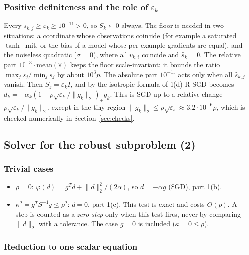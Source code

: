 \documentclass[11pt,a4paper]{article}
\newcommand{\norm}[1]{\lVert #1\rVert_2}
\begin{document}
\subsubsection*{Positive definiteness and the role of $\varepsilon_k$}

Every $s_{k,j}\ge\varepsilon_k\ge10^{-11}>0$, so $S_k\succ0$ always. The floor is
needed in two situations: a coordinate whose observations coincide (for example a
saturated $\tanh$ unit, or the bias of a model whose per-example gradients are equal),
and the noiseless quadratic ($\sigma=0$), where all $v_{k,i}$ coincide and
$\widehat s_k=0$. The relative part $10^{-3}\cdot\text{mean}(\widehat s)$ keeps the
floor scale-invariant: it bounds the ratio $\max_js_j/\min_js_j$ by about $10^3p$.
The absolute part $10^{-11}$ acts only when all $\widehat s_{k,j}$ vanish. Then
$S_k=\varepsilon_kI$, and by the isotropic formula of 1(d) R-SGD becomes
$d_k=-\alpha_k(1-\rho\sqrt{\varepsilon_k}/\norm{g_k})_+g_k$. This is SGD up to a
relative change $\rho\sqrt{\varepsilon_k}/\norm{g_k}$, except in the tiny region
$\norm{g_k}\le\rho\sqrt{\varepsilon_k}\approx3.2\cdot10^{-6}\rho$, which is checked
numerically in Section~\ref{sec:checks}.

\subsection{Solver for the robust subproblem (2)}\label{sec:solver}

\subsubsection*{Trivial cases}
\begin{itemize}
\item $\rho=0$: $\varphi(d)=g^Td+\norm d^2/(2\alpha)$, so $d=-\alpha g$ (SGD), part 1(b).
\item $\kappa^2=g^TS^{-1}g\le\rho^2$: $d=0$, part 1(c). This test is exact and costs
$O(p)$. A step is counted as a \emph{zero step} only when this test fires, never by
comparing $\norm d$ with a tolerance. The case $g=0$ is included ($\kappa=0\le\rho$).
\end{itemize}

\subsubsection*{Reduction to one scalar equation}
\end{document}
